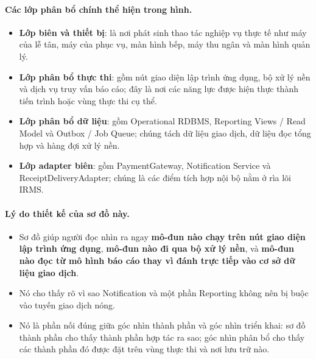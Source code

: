 \documentclass[11pt,a4paper]{article}
\begin{document}
\paragraph{Các lớp phân bổ chính thể hiện trong hình.}
\begin{itemize}
  \item \textbf{Lớp biên và thiết bị}: là nơi phát sinh thao tác nghiệp vụ thực tế như máy của lễ tân, máy của phục vụ, màn hình bếp, máy thu ngân và màn hình quản lý.
  \item \textbf{Lớp phân bổ thực thi}: gồm nút giao diện lập trình ứng dụng, bộ xử lý nền và dịch vụ truy vấn báo cáo; đây là nơi các năng lực được hiện thực thành tiến trình hoặc vùng thực thi cụ thể.
  \item \textbf{Lớp phân bổ dữ liệu}: gồm \textsf{Operational RDBMS}, \textsf{Reporting Views / Read Model} và \textsf{Outbox / Job Queue}; chúng tách dữ liệu giao dịch, dữ liệu đọc tổng hợp và hàng đợi xử lý nền.
  \item \textbf{Lớp adapter biên}: gồm \textsf{PaymentGateway}, \textsf{Notification Service} và \textsf{ReceiptDeliveryAdapter}; chúng là các điểm tích hợp nội bộ nằm ở rìa lõi IRMS.
\end{itemize}

\paragraph{Lý do thiết kế của sơ đồ này.}
\begin{itemize}
  \item Sơ đồ giúp người đọc nhìn ra ngay \textbf{mô-đun nào chạy trên nút giao diện lập trình ứng dụng}, \textbf{mô-đun nào đi qua bộ xử lý nền}, và \textbf{mô-đun nào đọc từ mô hình báo cáo thay vì đánh trực tiếp vào cơ sở dữ liệu giao dịch}.
  \item Nó cho thấy rõ vì sao \textsf{Notification} và một phần \textsf{Reporting} không nên bị buộc vào tuyến giao dịch nóng.
  \item Nó là phần nối đúng giữa góc nhìn thành phần và góc nhìn triển khai: sơ đồ thành phần cho thấy thành phần hợp tác ra sao; góc nhìn phân bổ cho thấy các thành phần đó được đặt trên vùng thực thi và nơi lưu trữ nào.
\end{itemize}
\end{document}
